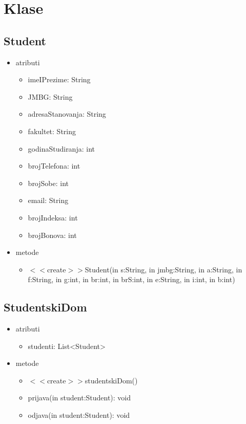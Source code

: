 \documentclass{article}
\begin{document}
\medskip 

\newpage

\section{Klase}

\subsection*{Student}
\begin{itemize}
  \item atributi 
     \begin{itemize}
        \item imeIPrezime: String
        \item JMBG: String
        \item adresaStanovanja: String
        \item fakultet: String
        \item godinaStudiranja: int
        \item brojTelefona: int
        \item brojSobe: int
        \item email: String
        \item brojIndeksa: int
        \item brojBonova: int
     \end{itemize}
  \item metode
  \begin{itemize}
        \item \(<<\)create\(>>\)Student(in s:String, in jmbg:String, in a:String, in f:String, in g:int, in br:int, in brS:int, in e:String, in i:int, in b:int)
     \end{itemize}
\end{itemize}

\subsection*{StudentskiDom}
\begin{itemize}
  \item atributi 
     \begin{itemize}
        \item studenti: List<Student>
     \end{itemize}
  \item metode
  \begin{itemize}
        \item \(<<\)create\(>>\)studentskiDom()
        \item prijava(in student:Student): void
        \item odjava(in student:Student): void
     \end{itemize}
\end{itemize}
\end{document}

